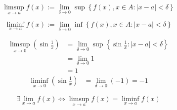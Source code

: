 \begin{defn}
  \begin{equation*}
    \limsup _{x \to a} f(x) := 
      \lim _{\delta \to 0} 
      \sup \left\{ f(x), x \in A : |x - a| < \delta \right\}
  \end{equation*}
\end{defn}

\begin{defn}
  \begin{equation*}
    \liminf _{x \to a} f(x) :=
      \lim _{\delta \to 0}
      \inf \left\{ f(x), x \in A : |x - a| < \delta \right\}
  \end{equation*}
\end{defn}

\begin{exmp}
  \begin{align*}
    \limsup _{x \to 0} \left( \sin \frac{1}{x} \right) 
    &= \lim _{\delta \to 0} \sup 
      \left\{ \sin \frac{1}{x} : |x - a| < \delta \right\} \\
    &= \lim _{\delta \to 0} 1 \\
    &= 1
  \end{align*}
  \begin{align*}
    \liminf _{x \to 0} \left( \sin \frac{1}{x} \right) 
    &= \lim _{\delta \to 0} (-1) = -1
  \end{align*}
\end{exmp}

\begin{prop}
  \begin{equation*}
    \exists \lim _{x \to a} f(x) \iff
    \limsup _{x \to a} f(x) = \liminf _{x \to a} f(x)
  \end{equation*}
\end{prop}
